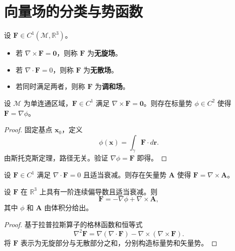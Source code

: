 \section{向量场的分类与势函数}

\begin{definition}\label{def:field_types}
设 $\mathbf{F} \in C^1(\mathcal{M}, \mathbb{R}^3)$。
\begin{itemize}
    \item 若 $\nabla \times \mathbf{F} = \mathbf{0}$，则称 $\mathbf{F}$ 为\textbf{无旋场}。
    \item 若 $\nabla \cdot \mathbf{F} = 0$，则称 $\mathbf{F}$ 为\textbf{无散场}。
    \item 若同时满足两者，则称 $\mathbf{F}$ 为\textbf{调和场}。
\end{itemize}
\end{definition}

\begin{theorem}[无旋场的势函数存在性]\label{thm:irrotational_potential}
设 $\mathcal{M}$ 为单连通区域，$\mathbf{F} \in C^1$ 满足 $\nabla \times \mathbf{F} = \mathbf{0}$。则存在标量势 $\phi \in C^2$ 使得 $\mathbf{F} = \nabla \phi$。
\end{theorem}

\begin{proof}
固定基点 $\mathbf{x}_0$，定义
\[
\phi(\mathbf{x}) = \int_{\gamma} \mathbf{F} \cdot d\mathbf{r}.
\]
由斯托克斯定理，路径无关。验证 $\nabla \phi = \mathbf{F}$ 即得。
\end{proof}

\begin{theorem}[无散场的矢量势存在性]\label{thm:solenoidal_potential}
设 $\mathbf{F} \in C^1$ 满足 $\nabla \cdot \mathbf{F} = 0$ 且适当衰减。则存在矢量势 $\mathbf{A}$ 使得 $\mathbf{F} = \nabla \times \mathbf{A}$。
\end{theorem}

\begin{theorem}[亥姆霍兹分解定理]\label{thm:helmholtz}
设 $\mathbf{F}$ 在 $\mathbb{R}^3$ 上具有一阶连续偏导数且适当衰减。则
\[
\mathbf{F} = -\nabla\phi + \nabla\times\mathbf{A},
\]
其中 $\phi$ 和 $\mathbf{A}$ 由体积分给出。
\end{theorem}

\begin{proof}
基于拉普拉斯算子的格林函数和恒等式
\[
\nabla^2 \mathbf{F} = \nabla(\nabla \cdot \mathbf{F}) - \nabla \times (\nabla \times \mathbf{F}).
\]
将 $\mathbf{F}$ 表示为无旋部分与无散部分之和，分别构造标量势和矢量势。
\end{proof}

